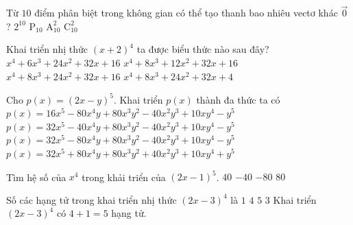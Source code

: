 \begin{ex}%
	Từ $10$ điểm phân biệt trong không gian có thể tạo thanh bao nhiêu vectơ khác $\vec{0}$?	
	\choice
	{$2^{10}$}
	{$\mathrm{P}_{10}$}
	{\True $\mathrm{A}^2_{10}$}
	{$\mathrm{C}^2_{10}$}
\end{ex}
\begin{ex}%
	Khai triển nhị thức $(x+2)^4$ ta được biểu thức nào sau đây?
	\choice
	{$x^4+6x^3+24x^2+32x+16$}
	{$x^4+8x^3+12x^2+32x+16$}
	{\True $x^4+8x^3+24x^2+32x+16$}
	{$x^4+8x^3+24x^2+32x+4$}
\end{ex}


\begin{ex}%
	Cho $p(x)=(2x-y)^5$. Khai triển $p(x)$ thành đa thức ta có
	\choice
	{$p(x)=16x^5-80x^4y+80x^3y^2-40x^2y^3+10xy^4-y^5$}
	{$p(x)=32x^5-40x^4y+80x^3y^2-40x^2y^3+10xy^4-y^5$}
	{\True $p(x)=32x^5-80x^4y+80x^3y^2-40x^2y^3+10xy^4-y^5$}
	{$p(x)=32x^5+80x^4y+80x^3y^2+40x^2y^3+10xy^4+y^5$}
\end{ex}



\begin{ex}%
	Tìm hệ số của $x^4$ trong khải triển của $(2x-1)^5$.
	\choice
	{$40$}
	{$-40$}
	{\True $-80$}
	{$80$}
\end{ex}

\begin{ex}%
	Số các hạng tử trong khai triển nhị thức $(2x-3)^4 $ là
	\choice
	{$1$}
	{$4$}
	{\True $5$}
	{$3$}
	\loigiai
	{Khai triển $(2x-3)^4 $ có $ 4+1=5 $ hạng tử.}
\end{ex}

